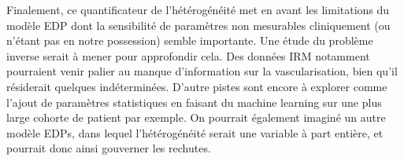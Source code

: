 \documentclass[12pt,a4paper]{article}
\newcommand{\hetero}{hétérogénéité\xspace}
\begin{document}
Finalement, ce quantificateur de l'\hetero met en avant les limitations du modèle EDP dont la sensibilité de paramètres non mesurables cliniquement (ou n'étant pas en notre possession) semble importante. Une étude du problème inverse serait à mener pour approfondir cela. Des données IRM notamment pourraient venir palier au manque d'information sur la vascularisation, bien qu'il résiderait quelques indéterminées. D'autre pistes sont encore à explorer comme l'ajout de paramètres statistiques en faisant du machine learning sur une plus large cohorte de patient par exemple. On pourrait également imaginé un autre modèle EDPs, dans lequel l'\hetero serait une variable à part  entière, et pourrait donc ainsi gouverner les rechutes. 
\end{document}
